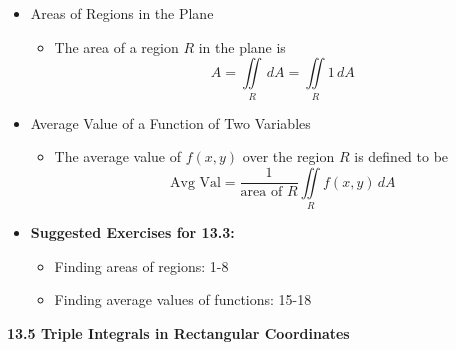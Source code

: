 \documentclass[12pt]{article}
\newcommand{\<}{\left<}
\renewcommand{\>}{\right>}
\begin{document}
  \begin{itemize}
  
  \item Areas of Regions in the Plane
    
    \begin{itemize}
    \item The area of a region $R$ in the plane is \[A = \iint\limits_R\,dA=\iint\limits_R 1\,dA\]
    \end{itemize}
    
  \item Average Value of a Function of Two Variables
  
    \begin{itemize}
    \item The average value of $f(x,y)$ over the region $R$ is defined to be \[\textrm{Avg Val} = \frac{1}{\textrm{area of }R}\iint\limits_R f(x,y)\,dA\]
    \end{itemize}
    
  \item \textbf{Suggested Exercises for 13.3:}
  
    \begin{itemize}
    \item Finding areas of regions: 1-8
    \item Finding average values of functions: 15-18
    \end{itemize}
    
  \end{itemize}
  
  \newpage
  
  \centerline{\bf 13.5 Triple Integrals in Rectangular Coordinates}
  
\end{document}
